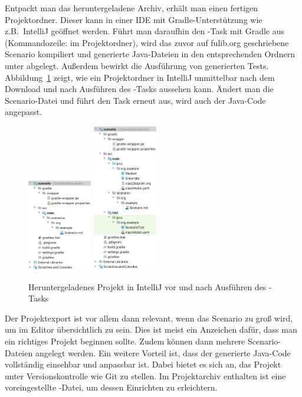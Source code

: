 Entpackt man das heruntergeladene Archiv, erhält man einen fertigen Projektordner.
Dieser kann in einer IDE mit Gradle-Unterstützung wie z.B.\ IntelliJ geöffnet werden.
Führt man daraufhin den -Task mit Gradle aus (Kommandozeile:  im Projektordner),
wird das zuvor auf fulib.org geschriebene Scenario kompiliert und generierte Java-Dateien in den entsprechenden Ordnern unter  abgelegt.
Außerdem bewirkt  die Ausführung von generierten Tests.
Abbildung~\ref{fig:project-downloaded} zeigt, wie ein Projektordner in IntelliJ unmittelbar nach dem Download und nach Ausführen des -Tasks aussehen kann.
Ändert man die Scenario-Datei und führt den Task erneut aus, wird auch der Java-Code angepasst.

\begin{figure}
    \centering
    \includegraphics[width=0.25\textwidth]{chapter/fulib.org/img/project-downloaded.png}
    \hspace{0.05\textwidth}
    \includegraphics[width=0.25\textwidth]{chapter/fulib.org/img/project-post-check.png}
    \caption{Heruntergeladenes Projekt in IntelliJ vor und nach Ausführen des -Tasks}
    \label{fig:project-downloaded}
\end{figure}

Der Projektexport ist vor allem dann relevant, wenn das Scenario zu groß wird, um im Editor übersichtlich zu sein.
Dies ist meist ein Anzeichen dafür, dass man ein richtiges Projekt beginnen sollte.
Zudem können dann mehrere Scenario-Dateien angelegt werden.
Ein weitere Vorteil ist, dass der generierte Java-Code vollständig einsehbar und anpassbar ist.
Dabei bietet es sich an, das Projekt unter Versionskontrolle wie Git zu stellen.
Im Projektarchiv enthalten ist eine voreingestellte -Datei, um dessen Einrichten zu erleichtern.

